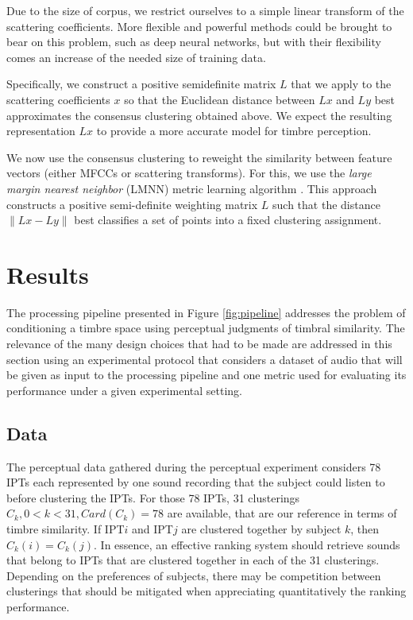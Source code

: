 \documentclass{bmcart}
\newcommand{\ipt}{IPT\xspace}
\newcommand{\ipts}{IPTs\xspace}
\begin{document}
Due to the size of corpus, we restrict ourselves to a simple linear transform of the scattering coefficients. More flexible and powerful methods could be brought to bear on this problem, such as deep neural networks, but with their flexibility comes an increase of the needed size of training data.

Specifically, we construct a positive semidefinite matrix $L$ that we apply to the scattering coefficients $x$ so that the Euclidean distance between $Lx$ and $Ly$ best approximates the consensus clustering obtained above.
We expect the resulting representation $Lx$ to provide a more accurate model for timbre perception.

We now use the consensus clustering to reweight the similarity between feature vectors (either MFCCs or scattering transforms).
For this, we use the \emph{large margin nearest neighbor} (LMNN) metric learning algorithm \cite{weinberger2006distance, weinberger2009distance}.
This approach constructs a positive semi-definite weighting matrix $L$ such that the distance $\|Lx - Ly\|$ best classifies a set of points into a fixed clustering assignment.

\section*{Results}
\label{sec:results}

The processing pipeline presented in Figure \ref{fig:pipeline} addresses the problem of conditioning a timbre space using perceptual judgments of timbral similarity. The relevance of the many design choices that had to be made  are addressed in this section using an experimental protocol that considers a dataset of audio that will be given as input to the processing pipeline and one metric used for evaluating its performance under a given experimental setting.

\subsection*{Data}

The perceptual data gathered during the perceptual experiment considers 78 \ipts each represented by one sound recording that the subject could listen to before clustering the \ipts. For those 78 \ipts, 31 clusterings $C_k, 0<k<31, Card(C_k)=78$ are available, that are our reference in terms of timbre similarity. If \ipt $i$ and \ipt $j$ are clustered together by subject $k$, then $C_k(i)=C_k(j)$. In essence, an effective ranking system should retrieve sounds that belong to \ipts that are clustered together in each of the 31 clusterings. Depending on the preferences of subjects, there may be competition between clusterings that should be mitigated when appreciating quantitatively the ranking performance.
\end{document}
